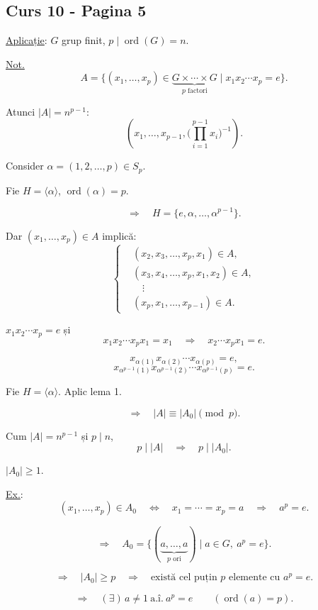 
\subsection*{Curs 10 - Pagina 5}

\noindent\underline{Aplicație}: $G$ grup finit, $p\mid\operatorname{ord}(G)=n$.

\bigskip
\noindent\underline{Not.}
\[
A=\bigl\{(x_1,\ldots,x_p)\in
\underbrace{G\times\cdots\times G}_{p\text{ factori}}
\mid x_1x_2\cdots x_p=e\bigr\}.
\]

\noindent Atunci $|A|=n^{p-1}$:
\[
(x_1,\ldots,x_{p-1},
\bigl(\prod_{i=1}^{p-1}x_i\bigr)^{-1}).
\]

\medskip
\noindent Consider $\alpha=(1,2,\ldots,p)\in S_p$.

\medskip
\noindent Fie $H=\langle\alpha\rangle$, $\operatorname{ord}(\alpha)=p$.

\[
\Longrightarrow\quad H=\{e,\alpha,\ldots,\alpha^{p-1}\}.
\]

\noindent Dar $(x_1,\ldots,x_p)\in A$ implică:
\[
\left\{\begin{aligned}
&(x_2,x_3,\ldots,x_p,x_1)\in A,\\
&(x_3,x_4,\ldots,x_p,x_1,x_2)\in A,\\
&\quad\vdots\\
&(x_p,x_1,\ldots,x_{p-1})\in A.
\end{aligned}\right.
\]

\noindent $x_1x_2\cdots x_p=e$ și
\[
x_1x_2\cdots x_px_1=x_1
\quad\Longrightarrow\quad x_2\cdots x_px_1=e.
\]

\[
x_{\alpha(1)}x_{\alpha(2)}\cdots x_{\alpha(p)}=e,
\]
\[
x_{\alpha^{p-1}(1)}x_{\alpha^{p-1}(2)}
\cdots x_{\alpha^{p-1}(p)}=e.
\]

\bigskip
\noindent Fie $H=\langle\alpha\rangle$. Aplic lema 1.

\[
\Longrightarrow\quad |A|\equiv |A_0|\pmod p.
\]

\noindent Cum $|A|=n^{p-1}$ și $p\mid n$,
\[
p\mid |A|\quad\Longrightarrow\quad p\mid |A_0|.
\]

\noindent $|A_0|\geq 1$.

\medskip
\noindent\underline{Ex.}:
\[
(x_1,\ldots,x_p)\in A_0
\quad\Longleftrightarrow\quad
x_1=\cdots=x_p=a
\quad\Longrightarrow\quad a^p=e.
\]

\[
\Longrightarrow\quad
A_0=\bigl\{(\underbrace{a,\ldots,a}_{p\text{ ori}})
\mid a\in G,\ a^p=e\bigr\}.
\]

\[
\Longrightarrow\quad |A_0|\geq p
\quad\Longrightarrow\quad
\text{există cel puțin }p\text{ elemente cu }a^p=e.
\]

\[
\Longrightarrow\quad (\exists)\,a\neq 1
\ \text{a.î.}\ a^p=e
\qquad (\operatorname{ord}(a)=p).
\]
